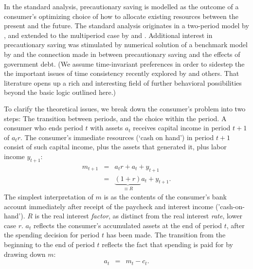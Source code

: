 


In the standard analysis, precautionary saving is modelled as the outcome of a consumer's optimizing choice of
how to allocate existing resources between the present and the future.  %
The standard analysis originates in a two-period model by \cite{LelandPrecaution}, and extended to the multiperiod case
by \cite{SibleyPIH} and \cite{MillerPIH}.
Additional interest in precautionary saving was stimulated by numerical solution
of a benchmark model by \cite{zeldesStochastic} and the connection made in \cite{barskymankiwzeldes:aer} between precautionary saving and
the effects of government debt.  %
(We assume time-invariant preferences in order to sidestep the the important issues
of time consistency recently explored by \cite{laibson:goldeneggs} and others.
That literature opens up a rich and interesting field of further behavioral possibilities
beyond the basic logic outlined here.)

To clarify the theoretical issues, we break down the consumer's
problem into two steps: The transition between periods, and the choice
within the period.  A consumer who ends period $t$ with assets
${a}_{t}$ receives capital income in period $t+1$ of ${a}_{t} r$.  The
consumer's immediate resources (`cash on hand') in period $t+1$ consist of such
capital income, plus the assets that generated it, plus labor income
${y}_{t+1}$:
\begin{eqnarray}
  \label{eq:mtp1}
  {m}_{t+1} & = & {a}_{t}r+{a}_{t}+{y}_{t+1}
\\ & = & \underbrace{(1+r)}_{\equiv R}{a}_{t}+{y}_{t+1}
.
\end{eqnarray}
The simplest interpretation of ${m}$ is as the contents of the
consumer's bank account immediately after receipt of the paycheck and
interest income ('cash-on-hand'). $R$ is the real interest {\em factor}, as distinct
from the real interest {\em rate}, lower case $r$.  ${a}_{t}$ reflects
the consumer's accumulated assets at the end of period $t$, after the
spending decision for period $t$ has been made.  The transition from
the beginning to the end of period $t$ reflects the fact that spending
is paid for by drawing down ${m}$:
\begin{eqnarray}
  {a}_{t} & = & {m}_{t}-{c}_{t}.
\end{eqnarray}

